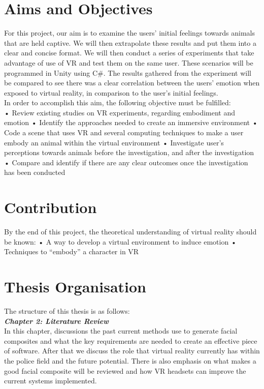 \documentclass[12pt]{report}
\begin{document}
\section{Aims and Objectives}
For this project, our aim is to examine the users’ initial feelings towards animals that are held captive. We will then extrapolate these results and put them into a clear and concise format. We will then conduct a series of experiments that take advantage of use of VR and test them on the same user. These scenarios will be programmed in Unity using C\#. The results gathered from the experiment will be compared to see there was a clear correlation between the users’ emotion when exposed to virtual reality, in comparison to the user’s initial feelings. 
\\

In order to accomplish this aim, the following objective must be fulfilled:
\\

•	Review existing studies on VR experiments, regarding embodiment and emotion
•	Identify the approaches needed to create an immersive environment
•	Code a scene that uses VR and several computing techniques to make a user embody an animal within the virtual environment
•	Investigate user’s perceptions towards animals before the investigation, and after the investigation
•	Compare and identify if there are any clear outcomes once the investigation has been conducted

\section{Contribution}

By the end of this project, the theoretical understanding of virtual reality should be known:
•	A way to develop a virtual environment to induce emotion
•	Techniques to “embody” a character in VR

\section{Thesis Organisation}
The structure of this thesis is as follows:
\\

\textbf{\textit{Chapter 2: Literature Review}}
\\

In this chapter, discussions the past current methods use to generate facial composites and what the key requirements are needed to create an effective piece of software.
After that we discuss the role that virtual reality currently has within the police field and the future potential. 
There is also emphasis on what makes a good facial composite will be reviewed and how VR headsets can improve the current systems implemented. 
\\
\end{document}
